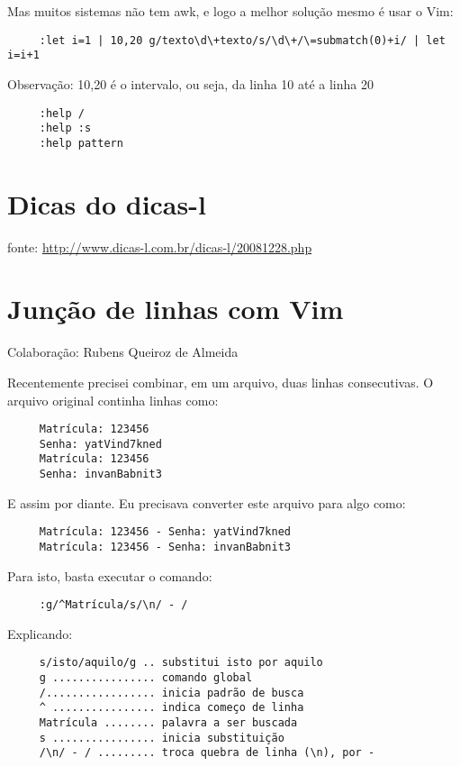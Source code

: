  Mas muitos sistemas não tem awk, e logo a melhor solução mesmo é usar o Vim:

\begin{verbatim}
     :let i=1 | 10,20 g/texto\d\+texto/s/\d\+/\=submatch(0)+i/ | let i=i+1
\end{verbatim}

Observação: 10,20 é o intervalo, ou seja, da linha 10 até a linha 20

\begin{verbatim}
     :help /
     :help :s
     :help pattern
\end{verbatim}

\section{Dicas do dicas-l}

fonte: \url{http://www.dicas-l.com.br/dicas-l/20081228.php}

\section{Junção de linhas com Vim}
\label{Junção de linhas com Vim}
Colaboração: Rubens Queiroz de Almeida

Recentemente precisei combinar, em um arquivo, duas linhas
consecutivas. O arquivo original continha linhas como:

\begin{verbatim}
     Matrícula: 123456
     Senha: yatVind7kned
     Matrícula: 123456
     Senha: invanBabnit3
\end{verbatim}

E assim por diante. Eu precisava converter este arquivo para algo como:

\begin{verbatim}
     Matrícula: 123456 - Senha: yatVind7kned
     Matrícula: 123456 - Senha: invanBabnit3
\end{verbatim}

Para isto, basta executar o comando:

\begin{verbatim}
     :g/^Matrícula/s/\n/ - /
\end{verbatim}

Explicando:

\begin{verbatim}
     s/isto/aquilo/g .. substitui isto por aquilo
     g ................ comando global
     /................. inicia padrão de busca
     ^ ................ indica começo de linha
     Matrícula ........ palavra a ser buscada
     s ................ inicia substituição
     /\n/ - / ......... troca quebra de linha (\n), por -
\end{verbatim}
